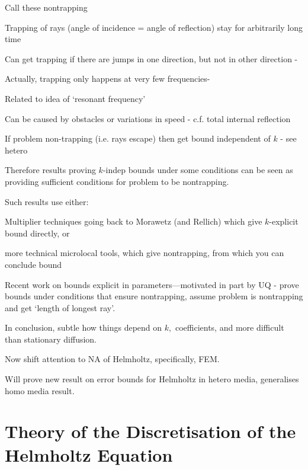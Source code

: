   \item Call these nontrapping
\item Trapping of rays (angle of incidence = angle of reflection) stay for arbitrarily long time
\item Can get trapping if there are jumps in one direction, but not in other direction - \cite{MoSp:19}
\item Actually, trapping only happens at very few frequencies-\cite{MoSp:19,LaSpWu:19}
\item Related to idea of `resonant frequency'
\item Can be caused by obstacles or variations in speed - c.f. total internal reflection
\item If problem non-trapping (i.e. rays escape) then get bound independent of $k$ - see hetero
\item Therefore results proving $k$-indep bounds under some conditions can be seen as providing sufficient conditions for problem to be nontrapping.
\item Such results use either:
\bit
\item Multiplier techniques going back to Morawetz (and Rellich)  which give $k$-explicit bound directly, or
\item more technical microlocal tools, which give nontrapping, from which you can conclude bound
\item Recent work on bounds explicit in parameters---motivated in part by UQ - \cite{FeLiLo:15,GrPeSp:19,PeSp:18} prove bounds under conditions that ensure nontrapping, \cite{GaSpWu:18} assume problem is nontrapping and get `length of longest ray'.
\eit
\item In conclusion, subtle how things depend on $k,$ coefficients, and more difficult than stationary diffusion.
\eit

\bit
\item Now shift attention to NA of Helmholtz, specifically, FEM.
  \item Will prove new result on error bounds for Helmholtz in hetero media, generalises homo media result.
  \eit

\section{Theory of the Discretisation of the Helmholtz Equation}
  
